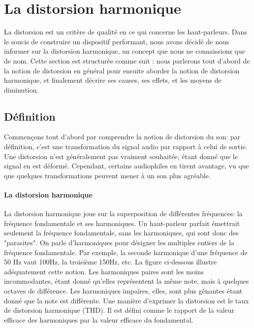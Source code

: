 

\section{La distorsion harmonique}
La distorsion est un critère de qualité en ce qui concerne les haut-parleurs.
Dans le soucis de construire un dispositif performant, nous avons décidé de 
nous informer sur la distorsion harmonique, un concept que nous ne connaissions
que de nom.
Cette section est structurée comme suit : nous parlerons tout d'abord de la notion  de distorsion 
en général pour ensuite aborder la notion  de distorsion 
harmonique, et finalement décrire ses causes, ses effets,
et les moyens de diminution.

\subsection{Définition}
Commençons tout d'abord par comprendre la notion de distorsion du son: par définition, c'est
une transformation du signal audio par rapport à celui de sortie. Une distorsion n'est généralement pas vraiment souhaitée, étant donné
que le signal en est déformé\cite{dico}. Cependant, certains audiophiles en tirent avantage, vu que que quelques
transformations peuvent mener à un son plus agréable\cite{encyclopedie}.

\paragraph{La distorsion harmonique}
La distorsion harmonique joue sur la superposition de différentes fréquences:
la fréquence fondamentale et ses harmoniques. Un haut-parleur parfait émettrait seulement la fréquence fondamentale, sans les harmoniques, qui sont donc des "parasites".
On parle d'harmoniques pour désigner les multiples entiers de la fréquence fondamentale\cite{encyclopedia}.
Par exemple, la seconde harmonique d'une fréquence de 50 Hz vaut 100Hz, la troisième 150Hz, etc. La figure 
ci-dessous illustre adéquatement cette notion.
Les harmoniques paires sont les moins incommodantes, étant donné qu'elles représentent la même note, mais à quelques octaves de différence.
Les harmoniques impaires, elles, sont plus gênantes étant donné que la note est différente\cite{hartmann}.
Une manière d'exprimer la distorsion est le taux de distorsion harmonique (THD). 
Il est défini comme le rapport de la valeur efficace des harmoniques par la valeur efficace du fondamental.


